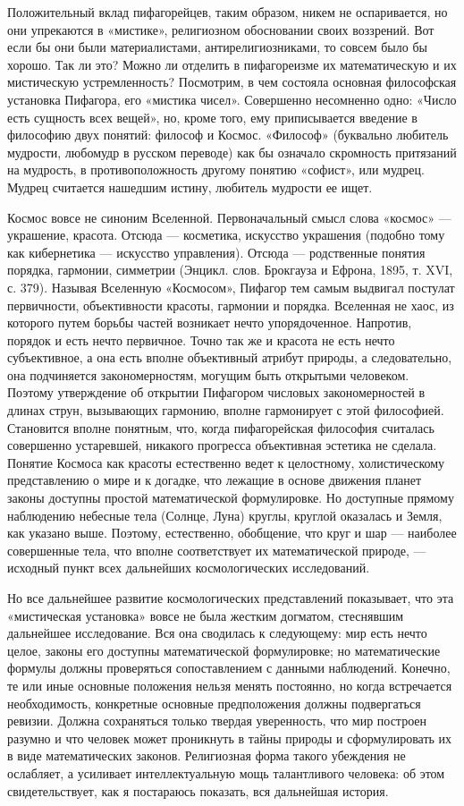Положительный вклад пифагорейцев, таким образом, никем не
оспаривается, но они упрекаются в «мистике», религиозном обосновании
своих воззрений. Вот если бы они были материалистами,
антирелигиозниками, то совсем было бы хорошо. Так ли это? Можно ли
отделить в пифагореизме их математическую и их мистическую
устремленность? Посмотрим, в чем состояла основная философская
установка Пифагора, его «мистика чисел». Совершенно несомненно одно:
«Число есть сущность всех вещей», но, кроме того, ему приписывается
введение в философию двух понятий: философ и Космос. «Философ»
(буквально любитель мудрости, любомудр в русском переводе) как бы
означало скромность притязаний на мудрость, в противоположность
другому понятию «софист», или мудрец. Мудрец считается нашедшим
истину, любитель мудрости ее ищет.

Космос вовсе не синоним Вселенной. Первоначальный смысл слова «космос»
--- украшение, красота. Отсюда --- косметика, искусство украшения
(подобно тому как кибернетика --- искусство управления). Отсюда ---
родственные понятия порядка, гармонии, симметрии (Энцикл. слов.
Брокгауза и Ефрона, 1895, т. XVI, с. 379). Называя Вселенную
«Космосом», Пифагор тем самым выдвигал постулат первичности,
объективности красоты, гармонии и порядка. Вселенная не хаос, из
которого путем борьбы частей возникает нечто упорядоченное. Напротив,
порядок и есть нечто первичное. Точно так же и красота не есть нечто
субъективное, а она есть вполне объективный атрибут природы, а
следовательно, она подчиняется закономерностям, могущим быть открытыми
человеком. Поэтому утверждение об открытии Пифагором числовых
закономерностей в длинах струн, вызывающих гармонию, вполне
гармонирует с этой философией. Становится вполне понятным, что, когда
пифагорейская философия считалась совершенно устаревшей, никакого
прогресса объективная эстетика не сделала. Понятие Космоса как красоты
естественно ведет к целостному, холистическому представлению о мире и
к догадке, что лежащие в основе движения планет законы доступны
простой математической формулировке. Но доступные прямому наблюдению
небесные тела (Солнце, Луна) круглы, круглой оказалась и Земля, как
указано выше. Поэтому, естественно, обобщение, что круг и шар ---
наиболее совершенные тела, что вполне соответствует их математической
природе, --- исходный пункт всех дальнейших космологических
исследований.

Но все дальнейшее развитие космологических представлений показывает,
что эта «мистическая установка» вовсе не была жестким догматом,
стеснявшим дальнейшее исследование. Вся она сводилась к следующему:
мир есть нечто целое, законы его доступны математической формулировке;
но математические формулы должны проверяться сопоставлением с данными
наблюдений. Конечно, те или иные основные положения нельзя менять
постоянно, но когда встречается необходимость, конкретные основные
предположения должны подвергаться ревизии. Должна сохраняться только
твердая уверенность, что мир построен разумно и что человек может
проникнуть в тайны природы и сформулировать их в виде математических
законов. Религиозная форма такого убеждения не ослабляет, а усиливает
интеллектуальную мощь талантливого человека: об этом свидетельствует,
как я постараюсь показать, вся дальнейшая история.

